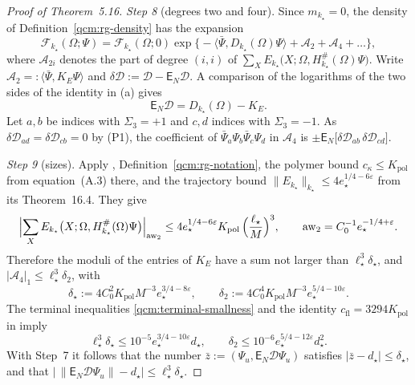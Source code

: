 \documentclass[11pt,letterpaper,reqno]{amsart}
\theoremstyle{definition}
\begin{document}
\begin{proof}[Proof of Theorem~5.16]
\emph{Step 8} (degrees two and four).
Since $m_{k_\star}=0$, the density of Definition~\ref{qcm:rg-density} has the expansion
\begin{equation*}
\mathscr F_{k_\star}(\Omega;\Psi)=\mathscr F_{k_\star}(\Omega;0)\exp\bigl\{-\langle\bar\Psi,D_{k_\star}(\Omega)\Psi\rangle+\mathcal A_2+\mathcal A_4+\dots\bigr\},
\end{equation*}
where $\mathcal A_{2i}$ denotes the part of degree $(i,i)$ of $\sum_XE_{k_\star}\bigl(X;\Omega,H^\#_{k_\star}(\Omega)\Psi\bigr)$.
Write $\mathcal A_2=:\langle\bar\Psi,K_E\Psi\rangle$ and $\delta\mathcal D:=\mathcal D-\mathsf E_N\mathcal D$.
A comparison of the logarithms of the two sides of the identity in (a) gives
\begin{equation*}
\mathsf E_N\mathcal D=D_{k_\star}(\Omega)-K_E .
\end{equation*}
Let $a,b$ be indices with $\Sigma_3=+1$ and $c,d$ indices with $\Sigma_3=-1$.
As $\delta\mathcal D_{ad}=\delta\mathcal D_{cb}=0$ by (P1), the coefficient of $\bar\Psi_a\Psi_b\bar\Psi_c\Psi_d$ in $\mathcal A_4$ is $\pm\mathsf E_N\bigl[\delta\mathcal D_{ab}\,\allowbreak \delta\mathcal D_{cd}\bigr]$.

\emph{Step 9} (sizes).
Apply \cite[equation~(21.28)]{QEDConstruction}, Definition~\ref{qcm:rg-notation}, the polymer bound $c_\kappa\le K_{\mathrm{pol}}$ from equation~(A.3) there, and the trajectory bound $\|E_{k_\star}\|_{k_\star}\le4e_\star^{1/4-6\varepsilon}$ from its Theorem~16.4. They give
\begin{equation*}
\Bigl|\sum_XE_{k_\star}\bigl(X;\Omega,H^\#_{k_\star}(\Omega)\Psi\bigr)\Bigr|_{\mathrm{aw}_2}\le4e_\star^{1/4-6\varepsilon}K_{\mathrm{pol}}\,\Bigl(\frac{\ell_\star}{M}\Bigr)^3,\qquad\mathrm{aw}_2=C_0^{-1}e_\star^{-1/4+\varepsilon}.
\end{equation*}
Therefore the moduli of the entries of $K_E$ have a sum not larger than $\ell_\star^3\delta_\star$, and $|\mathcal A_4|_1\le\ell_\star^3\delta_2$, with
\begin{equation*}
\delta_\star:=4C_0^2K_{\mathrm{pol}}M^{-3}e_\star^{3/4-8\varepsilon},\qquad\delta_2:=4C_0^4K_{\mathrm{pol}}M^{-3}e_\star^{5/4-10\varepsilon}.
\end{equation*}
The terminal inequalities \eqref{qcm:terminal-smallness} and the identity $c_{\mathrm{fl}}=3294K_{\mathrm{pol}}$ in \cite[Proposition~24.1]{QEDConstruction} imply
\begin{equation*}
\ell_\star^3\delta_\star\le10^{-5}e_\star^{3/4-10\varepsilon}d_\star,\qquad\delta_2\le10^{-6}e_\star^{5/4-12\varepsilon}d_\star^2 .
\end{equation*}
With Step~7 it follows that the number $\bar z:=(\Psi_u,\mathsf E_N\mathcal D\Psi_u)$ satisfies $|\bar z-d_\star|\le\delta_\star$, and that $\bigl|\,\allowbreak \|\mathsf E_N\mathcal D\Psi_u\|-d_\star\bigr|\le\ell_\star^3\delta_\star$.


\end{proof}
\end{document}
